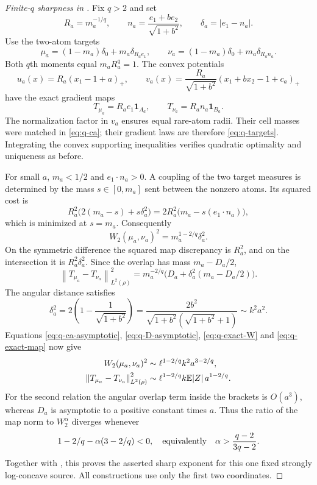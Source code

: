 \documentclass[11pt]{article}
\numberwithin{equation}{section}
\theoremstyle{remark}
\newcommand{\E}{\mathbb E}
\newcommand{\ind}{\mathbf 1}
\newcommand{\norm}[1]{\left\lVert #1\right\rVert}
\begin{document}
\begin{proof}[Finite-$q$ sharpness in ]
Fix $q>2$ and set
\[
 R_a=m_a^{-1/q},\qquad
 n_a=\frac{e_1+b e_2}{\sqrt{1+b^2}},\qquad
 \delta_a=|e_1-n_a|.
\]
Use the two-atom targets
\begin{equation}\label{eq:q-targets}
 \mu_a=(1-m_a)\delta_0+m_a\delta_{R_ae_1},\qquad
 \nu_a=(1-m_a)\delta_0+m_a\delta_{R_an_a}.
\end{equation}
Both $q$th moments equal $m_aR_a^q=1$. The convex potentials
\[
 u_a(x)=R_a(x_1-1+a)_+,
 \qquad
 v_a(x)=\frac{R_a}{\sqrt{1+b^2}}(x_1+b x_2-1+c_a)_+
\]
have the exact gradient maps
\[
 T_{\mu_a}=R_ae_1\ind_{A_a},\qquad
 T_{\nu_a}=R_an_a\ind_{B_a}.
\]
The normalization factor in $v_a$ ensures equal rare-atom radii. Their cell masses were matched in \eqref{eq:q-ca}; their gradient laws are therefore \eqref{eq:q-targets}. Integrating the convex supporting inequalities verifies quadratic optimality and uniqueness as before.

For small $a$, $m_a<1/2$ and $e_1\cdot n_a>0$. A coupling of the two target measures is determined by the mass $s\in[0,m_a]$ sent between the nonzero atoms. Its squared cost is
\[
 R_a^2\bigl(2(m_a-s)+s\delta_a^2\bigr)
 =2R_a^2\bigl(m_a-s(e_1\cdot n_a)\bigr),
\]
which is minimized at $s=m_a$. Consequently
\begin{equation}\label{eq:q-exact-W}
 W_2(\mu_a,\nu_a)^2=m_a^{1-2/q}\delta_a^2.
\end{equation}
On the symmetric difference the squared map discrepancy is $R_a^2$, and on the intersection it is $R_a^2\delta_a^2$. Since the overlap has mass $m_a-D_a/2$,
\begin{equation}\label{eq:q-exact-map}
 \norm{T_{\mu_a}-T_{\nu_a}}_{L^2(\rho)}^2
 =m_a^{-2/q}\bigl(D_a+\delta_a^2(m_a-D_a/2)\bigr).
\end{equation}
The angular distance satisfies
\[
 \delta_a^2=2\left(1-\frac1{\sqrt{1+b^2}}\right)
 =\frac{2b^2}{\sqrt{1+b^2}(\sqrt{1+b^2}+1)}\sim k^2a^2.
\]
Equations \eqref{eq:q-ca-asymptotic}, \eqref{eq:q-D-asymptotic}, \eqref{eq:q-exact-W} and \eqref{eq:q-exact-map} now give
\begin{align}
 W_2(\mu_a,\nu_a)^2
 &\sim\ell^{1-2/q}k^2a^{3-2/q},\notag\\
 \norm{T_{\mu_a}-T_{\nu_a}}_{L^2(\rho)}^2
 &\sim\ell^{1-2/q}k\E|Z|\,a^{1-2/q}.\label{eq:q-scales}
\end{align}
For the second relation the angular overlap term inside the brackets is $O(a^3)$, whereas $D_a$ is asymptotic to a positive constant times $a$. Thus the ratio of the map norm to $W_2^\alpha$ diverges whenever
\[
 1-2/q-\alpha(3-2/q)<0,
 \quad\hbox{equivalently}\quad
 \alpha>\frac{q-2}{3q-2}.
\]
Together with , this proves the asserted sharp exponent for this one fixed strongly log-concave source. All constructions use only the first two coordinates.
\end{proof}
\end{document}
